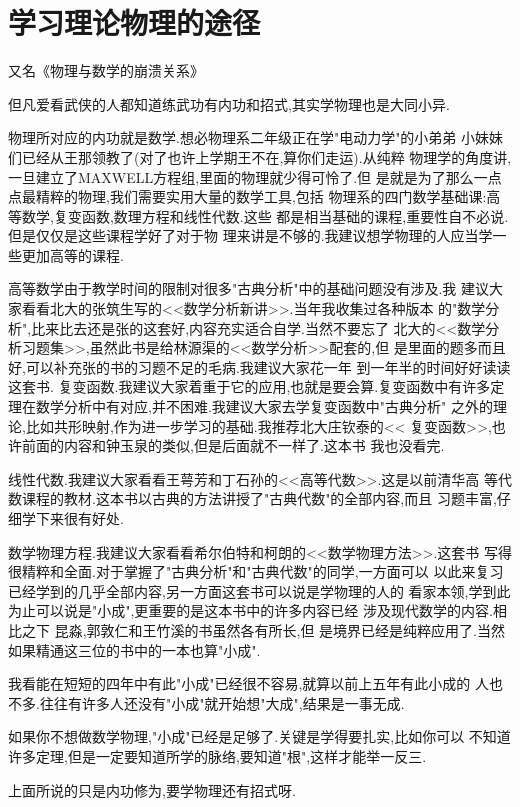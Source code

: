 \chapter{学习理论物理的途径}

又名《物理与数学的崩溃关系》


但凡爱看武侠的人都知道练武功有内功和招式,其实学物理也是大同小异.

物理所对应的内功就是数学.想必物理系二年级正在学"电动力学"的小弟弟
小妹妹们已经从王那领教了(对了也许上学期王不在,算你们走运).从纯粹
物理学的角度讲,一旦建立了MAXWELL方程组,里面的物理就少得可怜了.但
是就是为了那么一点点最精粹的物理,我们需要实用大量的数学工具,包括
物理系的四门数学基础课:高等数学,复变函数,数理方程和线性代数.这些
都是相当基础的课程,重要性自不必说.但是仅仅是这些课程学好了对于物
理来讲是不够的.我建议想学物理的人应当学一些更加高等的课程.

高等数学由于教学时间的限制对很多"古典分析"中的基础问题没有涉及.我
建议大家看看北大的张筑生写的<<数学分析新讲>>.当年我收集过各种版本
的"数学分析",比来比去还是张的这套好,内容充实适合自学.当然不要忘了
北大的<<数学分析习题集>>,虽然此书是给林源渠的<<数学分析>>配套的,但
是里面的题多而且好,可以补充张的书的习题不足的毛病.我建议大家花一年
到一年半的时间好好读读这套书.
复变函数.我建议大家着重于它的应用,也就是要会算.复变函数中有许多定
理在数学分析中有对应,并不困难.我建议大家去学复变函数中"古典分析"
之外的理论,比如共形映射,作为进一步学习的基础.我推荐北大庄钦泰的<<
复变函数>>,也许前面的内容和钟玉泉的类似,但是后面就不一样了.这本书
我也没看完.

线性代数.我建议大家看看王萼芳和丁石孙的<<高等代数>>.这是以前清华高
等代数课程的教材.这本书以古典的方法讲授了"古典代数"的全部内容,而且
习题丰富,仔细学下来很有好处.

数学物理方程.我建议大家看看希尔伯特和柯朗的<<数学物理方法>>.这套书
写得很精粹和全面.对于掌握了"古典分析"和"古典代数"的同学,一方面可以
以此来复习已经学到的几乎全部内容,另一方面这套书可以说是学物理的人的
看家本领,学到此为止可以说是"小成",更重要的是这本书中的许多内容已经
涉及现代数学的内容.相比之下  昆淼,郭敦仁和王竹溪的书虽然各有所长,但
是境界已经是纯粹应用了.当然如果精通这三位的书中的一本也算"小成".

我看能在短短的四年中有此"小成"已经很不容易,就算以前上五年有此小成的
人也不多.往往有许多人还没有"小成"就开始想"大成",结果是一事无成.

如果你不想做数学物理,"小成"已经是足够了.关键是学得要扎实,比如你可以
不知道许多定理,但是一定要知道所学的脉络,要知道"根",这样才能举一反三.


上面所说的只是内功修为,要学物理还有招式呀.


